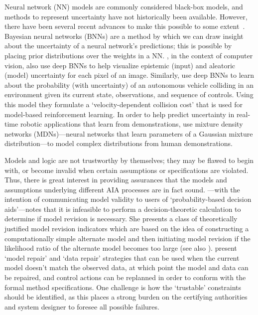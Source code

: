 Neural network (NN) models are commonly considered black-box models, and methods to represent uncertainty have not historically been available. However, there have been several recent advances to make this possible to some extent~\cite{Gal2016-om,Gal2016-eq}. Bayesian neural networks (BNNs) are a method by which we can draw insight about the uncertainty of a neural network's predictions; this is possible by placing prior distributions over the weights in a NN. \citet{Kendall2017-ry}, in the context of computer vision, also use deep BNNs to help visualize epistemic (input) and aleatoric (model) uncertainty for each pixel of an image. 
Similarly, \citet{Kahn2017-vy} use deep BNNs to learn about the probability (with uncertainty) of an autonomous vehicle colliding in an environment given its current state, observations, and sequence of controls. Using this model they formulate a `velocity-dependent collision cost' that is used for model-based reinforcement learning. 
In order to help predict uncertainty in real-time robotic applications that learn from demonstrations, \citet{Choi2017-th} use mixture density networks (MDNs)---neural networks that learn parameters of a Gaussian mixture distribution---to model complex distributions from human demonstrations.

Models and logic are not trustworthy by themselves; they may be flawed to begin with, or become invalid when certain assumptions or specifications are violated. Thus, there is great interest in providing assurances that the models and assumptions underlying different AIA processes are in fact sound. \citet{Laskey1991-mf}---with the intention of communicating model validity to users of `probability-based decision aids'---notes that it is infeasible to perform a decision-theoretic calculation to determine if model revision is necessary. She presents a class of theoretically justified model revision indicators which are based on the idea of constructing a computationally simple alternate model and then initiating model revision if the likelihood ratio of the alternate model becomes too large (see also \citet{Zagorecki2015-qy,Habbema1976-xd}). \citet{Ghosh2016-dl}  present `model repair' and `data repair' strategies that can be used when the current model doesn't match the observed data, at which point the model and data can be repaired, and control actions can be replanned in order to conform with the formal method specifications. One challenge is how the `trustable' constraints should be identified, as this places a strong burden on the certifying authorities and system designer to foresee all possible failures.
